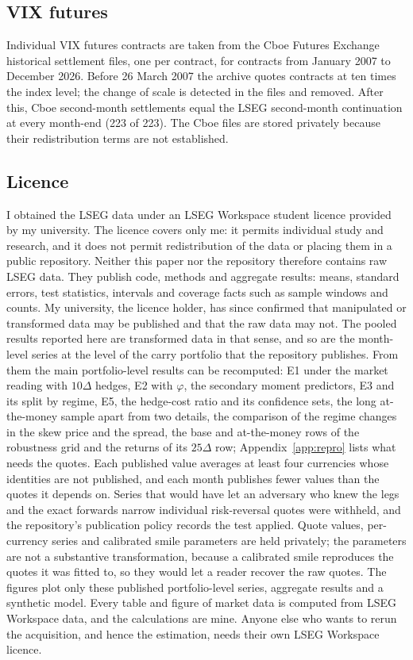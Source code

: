 \documentclass[11pt]{article}
\theoremstyle{result}
\newcommand{\D}{\Delta}
\begin{document}
\subsection{VIX futures}

Individual VIX futures contracts are taken from the Cboe Futures Exchange historical settlement files, one per contract, for contracts from January 2007 to December 2026. Before 26 March 2007 the archive quotes contracts at ten times the index level; the change of scale is detected in the files and removed. After this, Cboe second-month settlements equal the LSEG second-month continuation at every month-end (223 of 223). The Cboe files are stored privately because their redistribution terms are not established.

\subsection{Licence}\label{sec:licence}

I obtained the LSEG data under an LSEG Workspace student licence provided by my university. The licence covers only me: it permits individual study and research, and it does not permit redistribution of the data or placing them in a public repository. Neither this paper nor the repository therefore contains raw LSEG data. They publish code, methods and aggregate results: means, standard errors, test statistics, intervals and coverage facts such as sample windows and counts. My university, the licence holder, has since confirmed that manipulated or transformed data may be published and that the raw data may not. The pooled results reported here are transformed data in that sense, and so are the month-level series at the level of the carry portfolio that the repository publishes. From them the main portfolio-level results can be recomputed: E1 under the market reading with $10\D$ hedges, E2 with $\varphi$, the secondary moment predictors, E3 and its split by regime, E5, the hedge-cost ratio and its confidence sets, the long at-the-money sample apart from two details, the comparison of the regime changes in the skew price and the spread, the base and at-the-money rows of the robustness grid and the returns of its $25\D$ row; Appendix~\ref{app:repro} lists what needs the quotes. Each published value averages at least four currencies whose identities are not published, and each month publishes fewer values than the quotes it depends on. Series that would have let an adversary who knew the legs and the exact forwards narrow individual risk-reversal quotes were withheld, and the repository's publication policy records the test applied. Quote values, per-currency series and calibrated smile parameters are held privately; the parameters are not a substantive transformation, because a calibrated smile reproduces the quotes it was fitted to, so they would let a reader recover the raw quotes. The figures plot only these published portfolio-level series, aggregate results and a synthetic model. Every table and figure of market data is computed from LSEG Workspace data, and the calculations are mine. Anyone else who wants to rerun the acquisition, and hence the estimation, needs their own LSEG Workspace licence.
\end{document}
